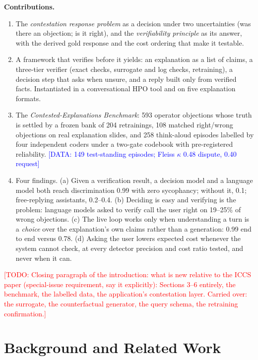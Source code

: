 \documentclass[preprint,12pt,3p,times]{elsarticle}
\newcommand{\todo}[1]{\textcolor{red}{[TODO: #1]}}
\newcommand{\done}[1]{\textcolor{blue}{[DATA: #1]}}   %
\begin{document}
\textbf{Contributions.}
\begin{enumerate}
  \item The \emph{contestation response problem} as a decision under two uncertainties (was there an objection; is it right), and the \emph{verifiability principle} as its answer, with the derived gold response and the cost ordering that make it testable.
  \item A framework that verifies before it yields: an explanation as a list of claims, a three-tier verifier (exact checks, surrogate and log checks, retraining), a decision step that asks when unsure, and a reply built only from verified facts. Instantiated in a conversational HPO tool and on five explanation formats.
  \item The \emph{Contested-Explanations Benchmark}: 593 operator objections whose truth is settled by a frozen bank of 204 retrainings, 108 matched right/wrong objections on real explanation slides, and 258 think-aloud episodes labelled by four independent coders under a two-gate codebook with pre-registered reliability. \done{149 test-standing episodes; Fleiss $\kappa$ 0.48 dispute, 0.40 request}
  \item Four findings. (a) Given a verification result, a decision model and a language model both reach discrimination 0.99 with zero sycophancy; without it, 0.1; free-replying assistants, 0.2--0.4. (b) Deciding is easy and verifying is the problem: language models asked to verify call the user right on 19--25\% of wrong objections. (c) The live loop works only when understanding a turn is a \emph{choice} over the explanation's own claims rather than a generation: 0.99 end to end versus 0.78. (d) Asking the user lowers expected cost whenever the system cannot check, at every detector precision and cost ratio tested, and never when it can.
\end{enumerate}
\todo{Closing paragraph of the introduction: what is new relative to the ICCS paper (special-issue requirement, say it explicitly): Sections 3--6 entirely, the benchmark, the labelled data, the application's contestation layer. Carried over: the surrogate, the counterfactual generator, the query schema, the retraining confirmation.}

\section{Background and Related Work}
\label{sec:related}
\end{document}
